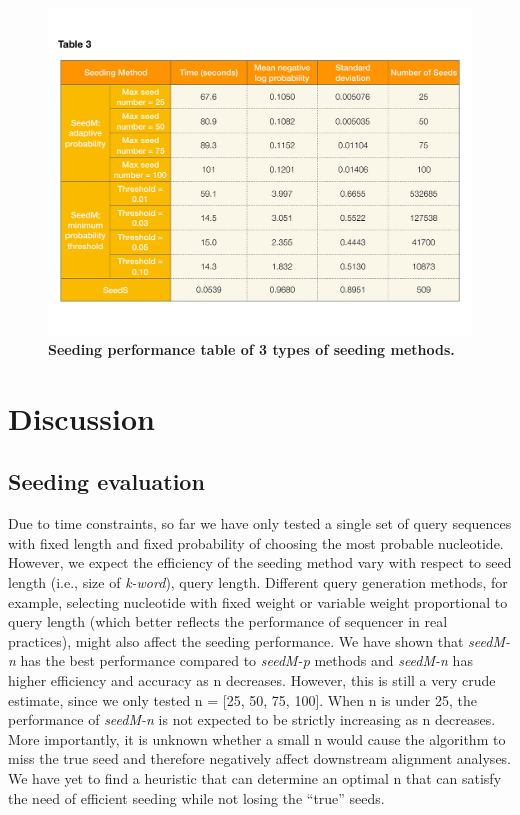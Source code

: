 \documentclass[12pt]{article}
\begin{document}
	\begin{figure}[!htb]
		\includegraphics[width=1\textwidth,trim={0.5cm 2cm 0.5cm 5cm},clip]{tab3} %
		\caption{\textbf{Seeding performance table of 3 types of seeding methods.}}
		\label{fig:seedTable}
	\end{figure}
		
\label{Discussion}
\section{Discussion}

\subsection{Seeding evaluation}
Due to time constraints, so far we have only tested a single set of query sequences with fixed length and fixed probability of choosing the most probable nucleotide. However, we expect the efficiency of the seeding method vary with respect to seed length (i.e., size of \textit{k-word}), query length. Different query generation methods, for example, selecting nucleotide with fixed weight or variable weight proportional to query length (which better reflects the performance of sequencer in real practices), might also affect the seeding performance. We have shown that \textit{seedM-n} has the best performance compared to \textit{seedM-p} methods and \textit{seedM-n} has higher efficiency and accuracy as n decreases. However, this is still a very crude estimate, since we only tested n = [25, 50, 75, 100]. When n is under 25, the performance of \textit{seedM-n} is not expected to be strictly increasing as n decreases. More importantly, it is unknown whether a small n would cause the algorithm to miss the true seed and therefore negatively affect downstream alignment analyses. We have yet to find a heuristic that can determine an optimal n that can satisfy the need of efficient seeding while not losing the “true” seeds. 
\end{document}
